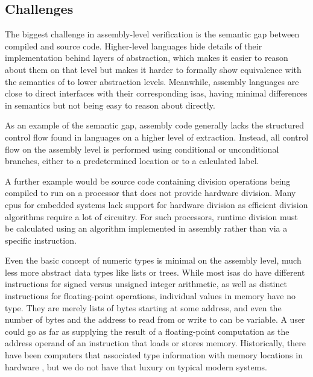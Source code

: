 \subsection{Challenges}
The biggest challenge in assembly-level verification is
the semantic gap between compiled and source code.
Higher-level languages hide details of their implementation
behind layers of abstraction, which makes it easier to reason about them on that level
but makes it harder to formally show equivalence with the semantics of
to lower abstraction levels.
Meanwhile, assembly languages are close to direct interfaces
with their corresponding \acp{isa},
having minimal differences in semantics but not being easy to reason about directly.

As an example of the semantic gap,
assembly code generally lacks the structured control flow found in languages
on a higher level of extraction.
Instead, all control flow on the assembly level is performed using conditional
or unconditional branches, either to a predetermined location
or to a calculated label.

A further example would be source code containing division operations
being compiled to run on a processor that does not provide hardware division.
Many \acp{cpu} for embedded systems lack support for hardware division
as efficient division algorithms require a lot of circuitry.
For such processors, runtime division must be calculated using an algorithm
implemented in assembly rather than via a specific instruction.

Even the basic concept of numeric types is minimal on the assembly level,
much less more abstract data types like lists or trees.
While most \acp{isa} do have different instructions
for signed versus unsigned integer arithmetic,
as well as distinct instructions for floating-point operations,
individual values in memory have no type.
They are merely lists of bytes starting at some address,
and even the number of bytes and the address to read from or write to can be variable.
A user could go as far as supplying the result of a floating-point computation
as the address operand of an instruction that loads or stores memory.
Historically, there have been computers that associated type information
with memory locations in hardware \autocite{feustel1972rice,feustel1973advantages,thornton2008rice},
but we do not have that luxury on typical modern systems.

